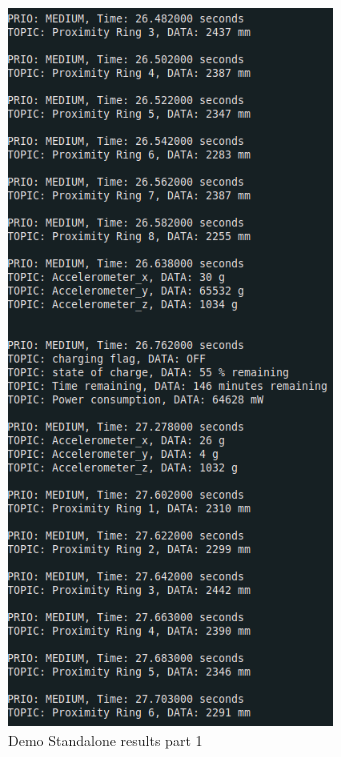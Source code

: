 \documentclass[12pt]{report}%
\begin{document}
\begin{figure}[ht]
	\centering
	\includegraphics[width=\textwidth, height=19cm]{standalone_1}
  	\caption{Demo Standalone results part 1}
  	\label{fig:res1}
\end{figure}
\end{document}

